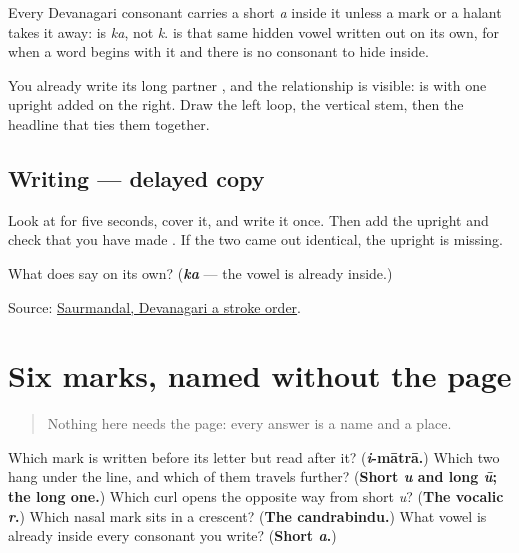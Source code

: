 Every Devanagari consonant carries a short \emph{a} inside it unless a mark or a halant takes it away: \textbf{} is \emph{ka}, not \emph{k}. \textbf{} is that same hidden vowel written out on its own, for when a word begins with it and there is no consonant to hide inside.

You already write its long partner \textbf{}, and the relationship is visible: \textbf{} is \textbf{} with one upright added on the right. Draw the left loop, the vertical stem, then the headline that ties them together.

\subsection*{Writing — delayed copy}

Look at \textbf{} for five seconds, cover it, and write it once. Then add the upright and check that you have made \textbf{}. If the two came out identical, the upright is missing.

\begin{tcolorbox}[breakable,colback=teal!4,colframe=teal!35!black,title={Before you move on}]
What does \textbf{} say on its own? (\emph{\textbf{ka}} — the vowel is already inside.)

Source: \href{https://commons.wikimedia.org/wiki/File:Devanagari\_\%E0\%A4\%85\_stroke\_order.svg}{Saurmandal, Devanagari a stroke order}.
\end{tcolorbox}
\section[six marks (sahā khuṇā)]{Six marks, named without the page}

\label{lesson:MR-R05-marks-recall}



\begin{quote}
Nothing here needs the page: every answer is a name and a place.
\end{quote}

\begin{tcolorbox}[breakable,colback=teal!4,colframe=teal!35!black,title={Before you move on}]
Which mark is written before its letter but read after it? (\textbf{\emph{i}-mātrā.}) Which two hang under the line, and which of them travels further? (\textbf{Short \emph{u} and long \emph{ū}; the long one.}) Which curl opens the opposite way from short \emph{u}? (\textbf{The vocalic \emph{r}.}) Which nasal mark sits in a crescent? (\textbf{The candrabindu.}) What vowel is already inside every consonant you write? (\textbf{Short \emph{a}.})
\end{tcolorbox}
